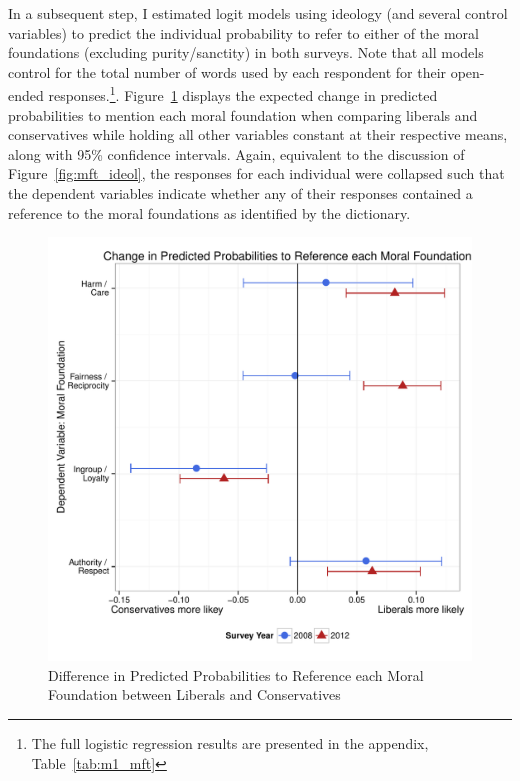 \documentclass[12pt]{paper}
\begin{document}
In a subsequent step, I estimated logit models using ideology (and several control variables) to predict the individual probability to refer to either of the moral foundations (excluding purity/sanctity) in both surveys. Note that all models control for the total number of words used by each respondent for their open-ended responses.\footnote{The full logistic regression results are presented in the appendix, Table~\ref{tab:m1_mft}}. Figure~\ref{fig:m1_mft} displays the expected change in predicted probabilities to mention each moral foundation when comparing liberals and conservatives while holding all other variables constant at their respective means, along with 95\% confidence intervals. Again, equivalent to the discussion of Figure~\ref{fig:mft_ideol}, the responses for each individual were collapsed such that the dependent variables indicate whether any of their responses contained a reference to the moral foundations as identified by the dictionary. 

\begin{figure}\centering
\includegraphics[scale=.6]{../calc/fig/m1_mft.pdf}
\caption{Difference in Predicted Probabilities to Reference each Moral Foundation between Liberals and Conservatives}\label{fig:m1_mft}
\end{figure}
\end{document}
